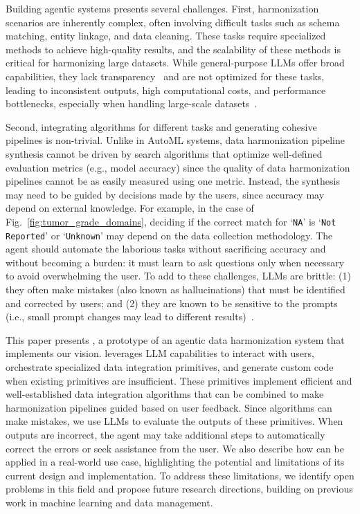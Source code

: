 \vspace{-0.2em}
Building agentic systems presents several challenges.
First, harmonization scenarios are inherently complex, often involving difficult tasks such as schema matching, entity linkage, and data cleaning. These tasks require specialized methods to achieve high-quality results, and the scalability of these methods is critical for harmonizing large datasets.
While general-purpose LLMs offer broad capabilities, they lack transparency~\cite{pmlr-v235-huang24x} and are not optimized for these tasks, leading to inconsistent outputs, high computational costs, and performance bottlenecks, especially when handling large-scale datasets~\cite{llmDisruptVLDB2023,hsieh-etal-2023-distilling}.

Second, integrating algorithms for different tasks and generating cohesive pipelines is non-trivial.
Unlike in AutoML systems, data harmonization pipeline synthesis cannot be driven by search algorithms that optimize well-defined evaluation metrics (e.g., model accuracy) since the quality of data harmonization pipelines cannot be as easily measured using one metric.
Instead, the synthesis may need to be guided by decisions made by the users, since accuracy may depend on external knowledge. For example, in the case of Fig.~\ref{fig:tumor_grade_domains}, deciding if the correct match for `\texttt{NA}' is `\texttt{Not Reported}' or `\texttt{Unknown}' may depend on the data collection methodology.
The agent should automate the laborious tasks without sacrificing accuracy and without becoming a burden: it must learn to ask questions only when necessary to avoid overwhelming the user.
To add to these challenges, LLMs are brittle: (1) they often make mistakes (also known as hallucinations) that must be identified and corrected by users; and (2) they are known to be sensitive to the prompts (i.e., small prompt changes may lead to different results)~\cite{barrie2024prompt, khattab2024dspy}.

This paper presents \systemname, a prototype of an agentic data harmonization system that implements our vision. 
\systemname leverages LLM capabilities to interact with users, orchestrate specialized data integration primitives, and generate custom code when existing primitives are insufficient. These primitives implement efficient and well-established data integration algorithms that can be combined to make harmonization pipelines guided based on user feedback. Since algorithms can make mistakes, we use LLMs to evaluate the outputs of these primitives. When outputs are incorrect, the agent may take additional steps to automatically correct the errors or seek assistance from the user.
We also describe how \systemname can be applied in a real-world use case, highlighting the potential and limitations of its current design and implementation. To address these limitations, we identify open problems in this field and propose future research directions, building on previous work in machine learning and data management.


